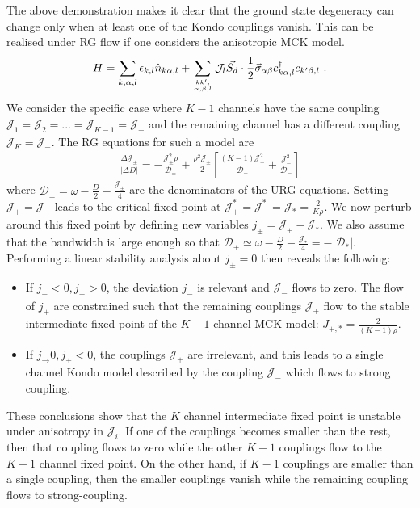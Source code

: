 \documentclass[reprint,prb,superscriptaddress]{revtex4-2}
\begin{document}
The above demonstration makes it clear that the ground state degeneracy can change only when at least one of the Kondo couplings vanish. This can be realised under RG flow if one considers the anisotropic MCK model.
\begin{align}
	H = \sum_{k,\alpha,l}\epsilon_{k,l} \hat n_{k\alpha,l} + \sum_{kk^\prime,\atop{\alpha,\beta,l}}{\mathcal{J}}_l \vec{S_d}\cdot\frac{1}{2}\vec{\sigma}_{\alpha\beta}c_{k\alpha,l}^\dagger c_{k^\prime\beta, l}~.
\end{align}
We consider the specific case where \(K-1\) channels have the same coupling \({\mathcal{J}}_1 = {\mathcal{J}}_2 = ... = {\mathcal{J}}_{K-1} = {\mathcal{J}}_+\) and the remaining channel has a different coupling \({\mathcal{J}}_K = {\mathcal{J}}_-\). The RG equations for such a model are
\begin{align}
	\frac{\Delta {\mathcal{J}}_\pm}{|\Delta D|} = -\frac{{\mathcal{J}}_\pm^2 \rho}{\mathcal{D}_\pm} + \frac{\rho^2 {\mathcal{J}}_\pm}{2}\left[\frac{(K-1){\mathcal{J}}_+^2}{\mathcal{D}_+} + \frac{{\mathcal{J}}_-^2}{\mathcal{D}_-}\right]
\end{align}
where \(\mathcal{D}_\pm = \omega - \frac{D}{2} - \frac{{\mathcal{J}}_\pm}{4}\) are the denominators of the URG equations.
Setting \({\mathcal{J}}_+ = {\mathcal{J}}_-\) leads to the critical fixed point at \({\mathcal{J}}_+^* = {\mathcal{J}}_-^* = {\mathcal{J}}_* = \frac{2}{K \rho}\). We now perturb around this fixed point by defining new variables \(j_\pm = {\mathcal{J}}_\pm - {\mathcal{J}}_*\). We also assume that the bandwidth is large enough so that \(\mathcal{D}_\pm \simeq \omega - \frac{D}{2} - \frac{{\mathcal{J}}_*}{4} = -|\mathcal{D}_*|\). Performing a linear stability analysis about \(j_\pm=0\) then reveals the following:
\begin{itemize}
	\item If \(j_-<0,j_+>0\), the deviation \(j_-\) is relevant and \(\mathcal{J}_-\) flows to zero. The flow of \(j_+\) are constrained such that the remaining couplings \(\mathcal{J}_+\) flow to the stable intermediate fixed point of the \(K-1\) channel MCK model: \(J_{+,*} = \frac{2}{(K-1)\rho}\).
	\item If \(j_\to 0, j_+<0\), the couplings \(\mathcal{J}_+\) are irrelevant, and this leads to a single channel Kondo model described by the coupling \(\mathcal{J}_-\) which flows to strong coupling.
\end{itemize}
These conclusions show that the \(K\) channel intermediate fixed point is unstable under anisotropy in \(\mathcal{J}_i\). If one of the couplings becomes smaller than the rest, then that coupling flows to zero while the other \(K-1\) couplings flow to the \(K-1\) channel fixed point. On the other hand, if \(K-1\) couplings are smaller than a single coupling, then the smaller couplings vanish while the remaining coupling flows to strong-coupling.
\end{document}
